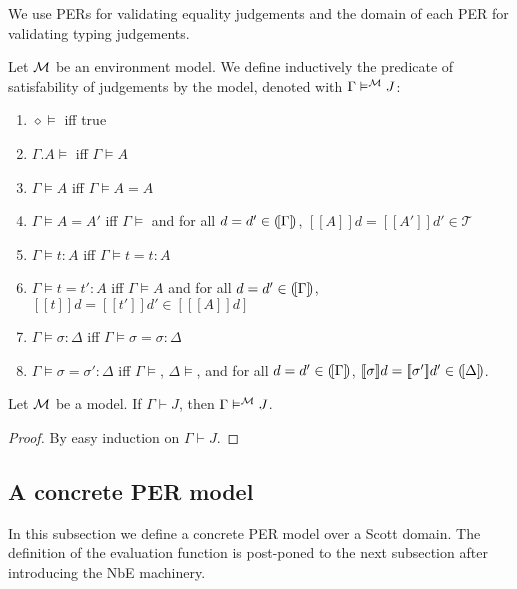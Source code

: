 \documentclass{LMCS}
\theoremstyle{plain}\newtheorem{satz}[thm]{Satz}
\newcommand{\ectx}{\diamond}
\newcommand{\ctxe}[2]{#1.#2}
\newcommand{\perT}{\mathcal{T}}
\newcommand{\semc}[1]{[\![#1]\!]}
\begin{document}
{\noindent We use PERs for validating equality judgements and the domain of each
PER for validating typing judgements.

\begin{defi}[Validity] Let $\mathcal{M}$ be an environment model. We
  define inductively the predicate of satisfability of judgements by
  the model, denoted with $\Gamma\vDash^{\mathcal{M}} J$:
  \begin{enumerate}[(1)]
  \item $\ectx \vDash$ iff true
  \item $\ctxe{\Gamma}{A}\vDash$ iff $\Gamma\vDash A$
  \item $\Gamma\vDash A$ iff $\Gamma\vDash A = A$
  \item $\Gamma\vDash A=A'$ iff $\Gamma\vDash$ and for all $d = d' \in
    (\![{\Gamma}]\!)$, $\semc{A}{d} = \semc{A'}{d'} \in \perT $
  \item $\Gamma\vDash t: A$ iff $\Gamma\vDash t = t:A$
  \item $\Gamma\vDash t=t':A$ iff $\Gamma\vDash A$ and for all $d =
    d'\in (\![{\Gamma}]\!)$, $\semc{t}{d} = \semc{t'}{d'} \in
    [\semc{A}{d}] $
  \item $\Gamma\vDash \sigma: \Delta$ iff $\Gamma\vDash \sigma =
    \sigma:\Delta$
  \item $\Gamma\vDash \sigma=\sigma':\Delta$ iff $\Gamma\vDash$,
    $\Delta\vDash$, and for all $d = d' \in (\![{\Gamma}]\!)$,
    $\semc{\sigma}{d} = \semc{\sigma'}{d'}\in \semctx{\Delta}$.
  \end{enumerate}
\end{defi}


\begin{thm}
  \label{thm:soundness} Let $\mathcal{M}$ be a model. If $\Gamma \vdash J$,
  then $\Gamma\vDash^{\mathcal{M}} J$.
\end{thm}
\begin{proof} By easy induction on $\Gamma \vdash J$. 
\end{proof}

 
  \subsection{A concrete PER model} In this subsection we define a
  concrete PER model over a Scott domain. The definition of the
  evaluation function is post-poned to the next subsection after
  introducing the NbE machinery.}
\end{document}

